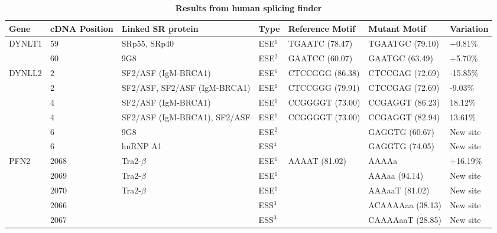 \documentclass[10pt]{article}
\begin{document}
\begin{table}[!ht]
\caption{
\bf{Results from human splicing finder}}
\begin{tabular}{|l|p{1cm}|p{3cm}|l|l|l|l|}
\hline
Gene &  cDNA Position & Linked SR protein & Type & Reference Motif & Mutant Motif & Variation \\
\hline
DYNLT1 & 59 & SRp55, SRp40 & ESE$^{1}$& TGAATC (78.47) & TGAATGC (79.10) & +0.81\% \\
& 60 & 9G8 & ESE$^{2}$ & GAATCC (60.07) & GAATGC (63.49) & +5.70\% \\
\hline
DYNLL2 & 2 & SF2/ASF (IgM-BRCA1) & ESE$^{1}$ & CTCCGGG (86.38) & CTCCGAG (72.69) & -15.85\% \\
& 2 & SF2/ASF, SF2/ASF (IgM-BRCA1) & ESE$^{1}$ & CTCCGGG (79.91) & CTCCGAG (72.69) & -9.03\% \\
& 4 & SF2/ASF (IgM-BRCA1) & ESE$^{1}$& CCGGGGT (73.00) & CCGAGGT (86.23) & 18.12\% \\
& 4 & SF2/ASF (IgM-BRCA1), SF2/ASF & ESE$^{1}$ & CCGGGGT (73.00) & CCGAGGT (82.94) & 13.61\% \\
& 6 & 9G8 & ESE$^{2}$ & & GAGGTG (60.67) & New site \\
& 6 & hnRNP A1 & ESS$^{4}$& & GAGGTG (74.05) & New site \\
\hline
PFN2 & 2068 & Tra2-$\beta$ & ESE$^{1}$ & AAAAT (81.02) & AAAAa & +16.19\% \\
& 2069 & Tra2-$\beta$ & ESE$^{1}$ & & AAAaa (94.14) & New site \\
& 2070 & Tra2-$\beta$ & ESE$^{1}$ & & AAAaaT (81.02) & New site \\
 & 2066 & & ESS$^{3}$ & & ACAAAAaa (38.13) & New site \\
 & 2067 & & ESS$^{3}$ & & CAAAAaaT (28.85) & New site \\
\hline


\end{tabular}
\end{table}
\end{document}
